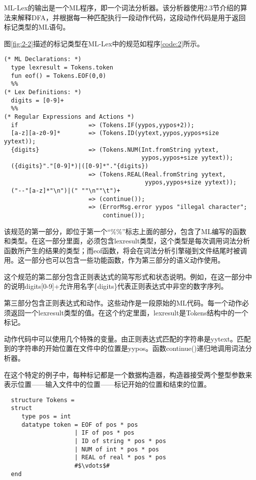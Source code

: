 \documentclass[cn,11pt,chinese]{elegantbook}
\newenvironment{code}{\captionsetup{type=listing}}{}
\begin{document}
ML-Lex的输出是一个ML程序，即一个词法分析器。该分析器使用2.3节介绍的算法来解释DFA，并根据每一种匹配执行一段动作代码，这段动作代码是用于返回标记类型的ML语句。

图\ref{fig:2-2}描述的标记类型在ML-Lex中的规范如程序\ref{code:2}所示。

\begin{code}
\label{code:2}
\begin{verbatim}
(* ML Declarations: *)
  type lexresult = Tokens.token
  fun eof() = Tokens.EOF(0,0)
  %%
(* Lex Definitions: *)
  digits = [0-9]+
  %%
(* Regular Expressions and Actions *)
  if                    => (Tokens.IF(yypos,yypos+2));
  [a-z][a-z0-9]*        => (Tokens.ID(yytext,yypos,yypos+size yytext));
  {digits}              => (Tokens.NUM(Int.fromString yytext,
                                       yypos,yypos+size yytext));
  ({digits}"."[0-9]*)|([0-9]*"."{digits})
                        => (Tokens.REAL(Real.fromString yytext,
                                        yypos,yypos+size yytext));
  ("--"[a-z]*"\n")|(" ""\n""\t")+
                        => (continue());
                        => (ErrorMsg.error yypos "illegal character";
                            continue());
\end{verbatim}
\end{code}

该规范的第一部分，即位于第一个“\%\%”标志上面的部分，包含了ML编写的函数和类型。在这一部分里面，必须包含lexresult类型，这个类型是每次调用词法分析函数所产生的结果的类型；而eof函数，将会在词法分析引擎碰到文件结尾时被调用。这一部分也可以包含一些功能函数，作为第三部分的语义动作使用。

这个规范的第二部分包含正则表达式的简写形式和状态说明。例如，在这一部分中的说明digits[0-9]+允许用名字\{digits\}代表正则表达式中非空的数字序列。

第三部分包含正则表达式和动作。这些动作是一段原始的ML代码。每一个动作必须返回一个lexresult类型的值。在这个约定里面，lexresult是Tokens结构中的一个标记。

动作代码中可以使用几个特殊的变量。由正则表达式匹配的字符串是yytext。匹配到的字符串的开始位置在文件中的位置是yypos。函数continue()递归地调用词法分析器。

在这个特定的例子中，每种标记都是一个数据构造器，构造器接受两个整型参数来表示位置——输入文件中的位置——标记开始的位置和结束的位置。

\begin{verbatim}
  structure Tokens =
  struct
     type pos = int
     datatype token = EOF of pos * pos
                    | IF of pos * pos
                    | ID of string * pos * pos
                    | NUM of int * pos * pos
                    | REAL of real * pos * pos
                    #$\vdots$#
  end
\end{verbatim}
\end{document}
